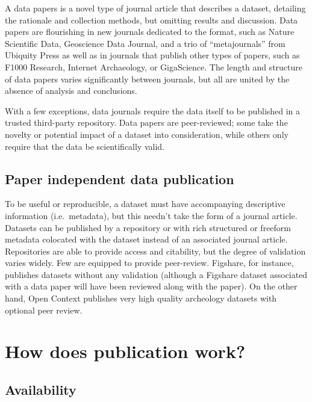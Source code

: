 \documentclass[10pt,a4paper,twocolumn]{article}
\begin{document}
A data papers is a novel type of journal article that describes a dataset, detailing the rationale and collection methods, but omitting results and discussion. Data papers are flourishing in new journals dedicated to the format, such as Nature Scientific Data\cite{nature_scientific_data}, Geoscience Data Journal\cite{geoscience_data_journal}, and a trio of ``metajournals'' from Ubiquity Press\cite{ubiquity_press_metajournals} as well as in journals that publish other types of papers, such as F1000 Research\cite{f1000_research}, Internet Archaeology\cite{internet_archaeology}, or GigaScience\cite{gigascience}. 
The length and structure of data papers varies significantly between journals, but all are united by the absence of analysis and conclusions.

With a few exceptions, data journals require the data itself to be published in a trusted third-party repository. 
Data papers are peer-reviewed; some take the novelty or potential impact of a dataset into consideration, while others only require that the data be scientifically valid.

\subsection*{Paper independent data publication}\label{paper-independent-data-publication}

To be useful or reproducible, a dataset must have accompanying descriptive information (i.e.~metadata), but this needn't take the form of a journal article. 
Datasets can be published by a repository or with rich structured or freeform metadata colocated with the dataset instead of an associated journal article. Repositories are able to provide access and citability, but the degree of validation varies widely. 
Few are equipped to provide peer-review. Figshare\cite{figshare}, for instance, publishes datasets without any validation (although a Figshare dataset associated with a data paper will have been reviewed along with the paper). 
On the other hand, Open Context publishes very high quality archeology datasets with optional peer review.

\section*{How does publication work?}\label{how-does-publication-work}

\subsection*{Availability}\label{availability}
\end{document}
